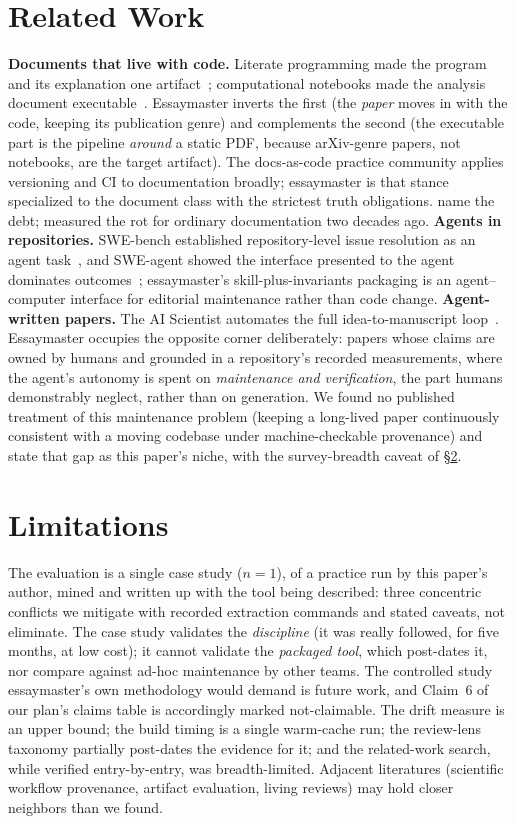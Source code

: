\documentclass{article}
\begin{document}
\section{Related Work}
\label{sec:related}
\textbf{Documents that live with code.} Literate programming made the program and its
explanation one artifact~\citep{knuth1984literate}; computational notebooks made the
analysis document executable~\citep{kluyver2016jupyter}. Essaymaster inverts the
first (the \emph{paper} moves in with the code, keeping its publication genre) and
complements the second (the executable part is the pipeline \emph{around} a static
PDF, because arXiv-genre papers, not notebooks, are the target artifact). The
docs-as-code practice community applies versioning and CI to documentation broadly;
essaymaster is that stance specialized to the document class with the strictest
truth obligations. \citet{olah2017research} name the debt;
\citet{lethbridge2003documentation} measured the rot for ordinary documentation two
decades ago.
\textbf{Agents in repositories.} SWE-bench established repository-level issue
resolution as an agent task~\citep{jimenez2024swebench}, and SWE-agent showed the
interface presented to the agent dominates outcomes~\citep{yang2024sweagent};
essaymaster's skill-plus-invariants packaging is an agent--computer interface for
editorial maintenance rather than code change.
\textbf{Agent-written papers.} The AI Scientist automates the full
idea-to-manuscript loop~\citep{lu2024aiscientist}. Essaymaster occupies the opposite
corner deliberately: papers whose claims are owned by humans and grounded in a
repository's recorded measurements, where the agent's autonomy is spent on
\emph{maintenance and verification}, the part humans demonstrably neglect, rather
than on generation. We found no published treatment of this maintenance problem
(keeping a long-lived paper continuously consistent with a moving codebase under
machine-checkable provenance) and state that gap as this paper's niche, with the
survey-breadth caveat of \S\ref{sec:limits}.

\section{Limitations}
\label{sec:limits}
The evaluation is a single case study ($n{=}1$), of a practice run by this paper's
author, mined and written up with the tool being described: three concentric
conflicts we mitigate with recorded extraction commands and stated caveats, not
eliminate. The case study validates the \emph{discipline} (it was really followed,
for five months, at low cost); it cannot validate the \emph{packaged tool}, which
post-dates it, nor compare against ad-hoc maintenance by other teams. The controlled
study essaymaster's own methodology would demand is future work, and Claim~6 of our
plan's claims table is accordingly marked not-claimable. The drift measure is an
upper bound; the build timing is a single warm-cache run; the review-lens taxonomy
partially post-dates the evidence for it; and the related-work search, while
verified entry-by-entry, was breadth-limited. Adjacent literatures (scientific
workflow provenance, artifact evaluation, living reviews) may hold closer neighbors
than we found.
\end{document}
